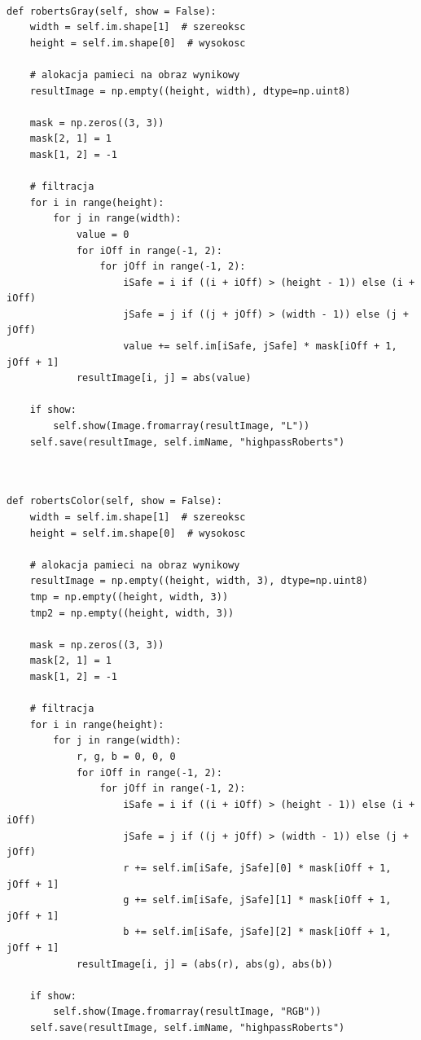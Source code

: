 \documentclass[final,a4paper,openany,12pt]{mwbk}
\begin{document}

\begin{lstlisting}[caption=Operator Roberts'a (obraz szary)]
	
def robertsGray(self, show = False):
	width = self.im.shape[1]  # szereoksc
	height = self.im.shape[0]  # wysokosc
	
	# alokacja pamieci na obraz wynikowy
	resultImage = np.empty((height, width), dtype=np.uint8)
	
	mask = np.zeros((3, 3))
	mask[2, 1] = 1
	mask[1, 2] = -1
	
	# filtracja
	for i in range(height):
		for j in range(width):
			value = 0
			for iOff in range(-1, 2):
				for jOff in range(-1, 2):
					iSafe = i if ((i + iOff) > (height - 1)) else (i + iOff)
					jSafe = j if ((j + jOff) > (width - 1)) else (j + jOff)
					value += self.im[iSafe, jSafe] * mask[iOff + 1, jOff + 1]
			resultImage[i, j] = abs(value)
	
	if show:
		self.show(Image.fromarray(resultImage, "L"))
	self.save(resultImage, self.imName, "highpassRoberts")
	
\end{lstlisting}


\newpage

\begin{lstlisting}[caption=Operator Roberts'a (obraz barwny)]
	
def robertsColor(self, show = False):
	width = self.im.shape[1]  # szereoksc
	height = self.im.shape[0]  # wysokosc
	
	# alokacja pamieci na obraz wynikowy
	resultImage = np.empty((height, width, 3), dtype=np.uint8)
	tmp = np.empty((height, width, 3))
	tmp2 = np.empty((height, width, 3))
	
	mask = np.zeros((3, 3))
	mask[2, 1] = 1
	mask[1, 2] = -1
	
	# filtracja
	for i in range(height):
		for j in range(width):
			r, g, b = 0, 0, 0
			for iOff in range(-1, 2):
				for jOff in range(-1, 2):
					iSafe = i if ((i + iOff) > (height - 1)) else (i + iOff)
					jSafe = j if ((j + jOff) > (width - 1)) else (j + jOff)
					r += self.im[iSafe, jSafe][0] * mask[iOff + 1, jOff + 1]
					g += self.im[iSafe, jSafe][1] * mask[iOff + 1, jOff + 1]
					b += self.im[iSafe, jSafe][2] * mask[iOff + 1, jOff + 1]
			resultImage[i, j] = (abs(r), abs(g), abs(b))
	
	if show:
		self.show(Image.fromarray(resultImage, "RGB"))
	self.save(resultImage, self.imName, "highpassRoberts")
	
\end{lstlisting}
\end{document}
